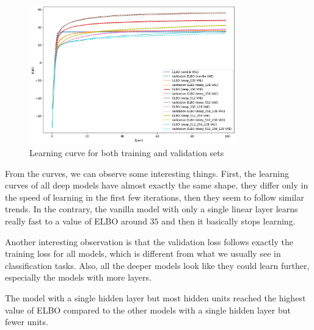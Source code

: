 \documentclass[a4paper,11pt]{article}
\begin{document}
\begin{figure}[ht]
    \centering
    \includegraphics[width=0.8\textwidth]{../images/learning_curve.png}
    \caption{Learning curve for both training and validation sets }
    \label{fig:learning_curve}
\end{figure}

From the curves, we can observe some interesting things.
First, the learning curves of all deep models have almost exactly the same shape, they differ only in the speed of learning in the first few iterations, then they seem to follow similar trends.
In the contrary, the vanilla model with only a single linear layer learns really fast to a value of ELBO around $35$ and then it basically stops learning.

Another interesting observation is that the validation loss follows exactly the training loss for all models, which is different from what we usually see in classification tasks.
Also, all the deeper models look like they could learn further, especially the models with more layers.

The model with a single hidden layer but most hidden units reached the highest value of ELBO compared to the other models with a single hidden layer but fewer units.
\end{document}
